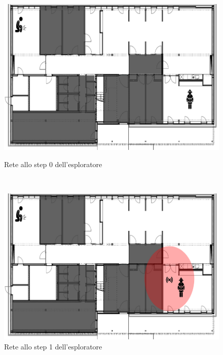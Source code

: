 \begin{figure}[h]
	\begin{minipage}[b]{6cm}
		\centering
		\includegraphics[scale=0.35]{Introduzione/intervento_step_0.png}
		\caption{Rete allo step 0 dell'esploratore}
		\label{fig:step0}
	\end{minipage}
	\ \hspace{10 mm} \
	\begin{minipage}[b]{6cm}
		\centering
		\includegraphics[scale=0.35]{Introduzione/intervento_step_1.png}
		\caption{Rete allo step 1 dell'esploratore}
		\label{fig:step1}
	\end{minipage}
\end{figure}


